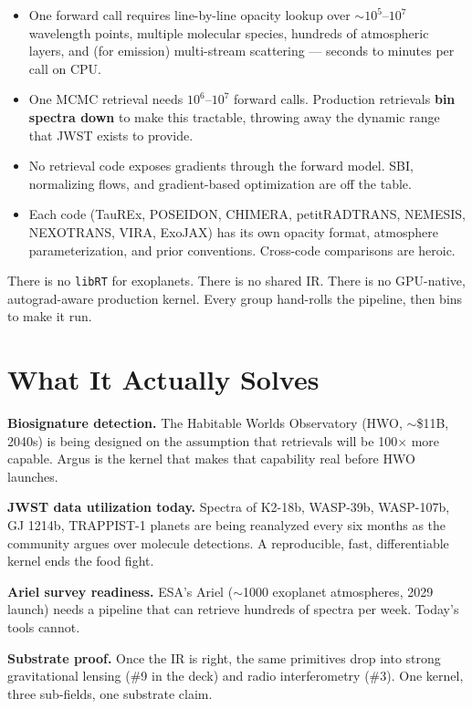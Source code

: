 \documentclass[11pt,a4paper]{article}
\begin{document}
\begin{itemize}[leftmargin=1.2em]
  \item One forward call requires line-by-line opacity lookup over $\sim 10^5$--$10^7$ wavelength points, multiple molecular species, hundreds of atmospheric layers, and (for emission) multi-stream scattering --- seconds to minutes per call on CPU.
  \item One MCMC retrieval needs $10^6$--$10^7$ forward calls. Production retrievals \textbf{bin spectra down} to make this tractable, throwing away the dynamic range that JWST exists to provide.
  \item No retrieval code exposes gradients through the forward model. SBI, normalizing flows, and gradient-based optimization are off the table.
  \item Each code (TauREx, POSEIDON, CHIMERA, petitRADTRANS, NEMESIS, NEXOTRANS, VIRA, ExoJAX) has its own opacity format, atmosphere parameterization, and prior conventions. Cross-code comparisons are heroic.
\end{itemize}

There is no \texttt{libRT} for exoplanets. There is no shared IR. There is no GPU-native, autograd-aware production kernel. Every group hand-rolls the pipeline, then bins to make it run.

\section{What It Actually Solves}

\begin{callout}
\textbf{Biosignature detection.} The Habitable Worlds Observatory (HWO, $\sim$\$11B, 2040s) is being designed on the assumption that retrievals will be 100$\times$ more capable. Argus is the kernel that makes that capability real before HWO launches.

\vspace{0.3em}
\textbf{JWST data utilization today.} Spectra of K2-18b, WASP-39b, WASP-107b, GJ 1214b, TRAPPIST-1 planets are being reanalyzed every six months as the community argues over molecule detections. A reproducible, fast, differentiable kernel ends the food fight.

\vspace{0.3em}
\textbf{Ariel survey readiness.} ESA's Ariel ($\sim$1000 exoplanet atmospheres, 2029 launch) needs a pipeline that can retrieve hundreds of spectra per week. Today's tools cannot.

\vspace{0.3em}
\textbf{Substrate proof.} Once the IR is right, the same primitives drop into strong gravitational lensing (\#9 in the deck) and radio interferometry (\#3). One kernel, three sub-fields, one substrate claim.
\end{callout}
\end{document}
